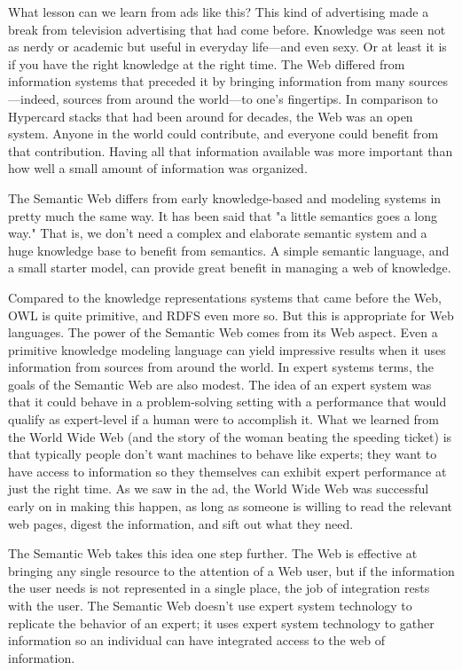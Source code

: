 What lesson can we learn from ads like this? This kind of advertising
made a break from television advertising that had come before. Knowledge
was seen not as nerdy or academic but useful in everyday life---and even
sexy. Or at least it is if you have the right knowledge at the right
time. The Web differed from information systems that preceded it by
bringing information from many sources---indeed, sources from around the
world---to one's fingertips. In comparison to Hypercard stacks that had
been around for decades, the Web was an open system. Anyone in the world
could contribute, and everyone could benefit from that contribution.
Having all that information available was more important than how well a
small amount of information was organized.

The Semantic Web differs from early knowledge-based and modeling systems in pretty much the same
way. It has been said that "a little semantics goes a long way."   That is, we don't need
a complex and elaborate semantic system and a huge knowledge base to benefit from semantics.  A 
simple semantic language, and  a small starter model, can provide great benefit in managing
a web of knowledge. 

Compared to the knowledge 
representations systems that came before the Web, OWL is quite
primitive, and RDFS even more so. But this is appropriate for  Web languages. The power of the
Semantic Web comes from its  Web aspect. Even a primitive knowledge
modeling language can yield impressive results when it uses information
from sources from around the world. In expert systems terms, the goals
of the Semantic Web are also modest. The idea of an expert system was
that it could behave in a problem-solving setting with a performance
that would qualify as expert-level if a human were to accomplish it.
What we learned from the World Wide Web (and the story of the woman
beating the speeding ticket) is that typically people don't want
machines to behave like experts; they want to have access to information
so they themselves can exhibit expert performance at just the right time. As we saw
in the ad, the World Wide Web was successful early on in making this
happen, as long as someone is willing to read the relevant web pages,
digest the information, and sift out what they need. 

The Semantic Web takes this idea one step further. The Web is effective
at bringing any single resource to the attention of a Web user, but if
the information the user needs is not represented in a single place, the
job of integration rests with the user. The Semantic Web doesn't use
expert system technology to replicate the behavior of an expert; it uses
expert system technology to gather information so an individual can have
integrated access to the web of information.

